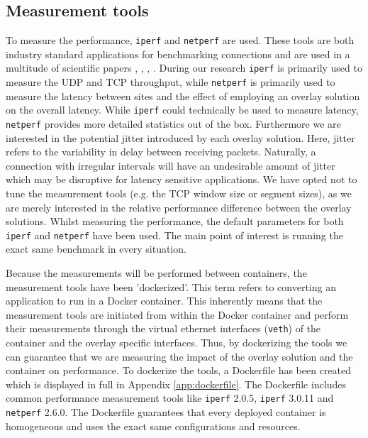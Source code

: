 \subsection{Measurement tools} \label{tools}
To measure the performance, \texttt{iperf} and \texttt{netperf} are used. These tools are both industry standard applications for benchmarking connections and are used in a multitude of scientific papers \cite{rohprimardho2015}, \cite{jorisclaassen2015}, \cite{Kra2015b}, \cite{barker2010empirical}. During our research \texttt{iperf} is primarily used to measure the UDP and TCP throughput, while \texttt{netperf} is primarily used to measure the latency between sites and the effect of employing an overlay solution on the overall latency. While \texttt{iperf} could technically be used to measure latency, \texttt{netperf} provides more detailed statistics out of the box. Furthermore we are interested in the potential jitter introduced by each overlay solution. Here, jitter refers to the variability in delay between receiving packets. Naturally, a connection with irregular intervals will have an undesirable amount of jitter which may be disruptive for latency sensitive applications. We have opted not to tune the measurement tools (e.g. the TCP window size or segment sizes), as we are merely interested in the relative performance difference between the overlay solutions. Whilst measuring the performance, the default parameters for both \texttt{iperf} and \texttt{netperf} have been used. The main point of interest is running the exact same benchmark in every situation. 

Because the measurements will be performed between containers, the measurement tools have been 'dockerized'. This term refers to converting an application to run in a Docker container. This inherently means that the measurement tools are initiated from within the Docker container and perform their measurements through the virtual ethernet interfaces (\texttt{veth}) of the container and the overlay specific interfaces. Thus, by dockerizing the tools we can guarantee that we are measuring the impact of the overlay solution and the container on performance. To dockerize the tools, a Dockerfile has been created which is displayed in full in Appendix \ref{app:dockerfile}. The Dockerfile includes common performance measurement tools like \texttt{iperf} 2.0.5, \texttt{iperf} 3.0.11 and \texttt{netperf} 2.6.0. The Dockerfile guarantees that every deployed container is homogeneous and uses the exact same configurations and resources. 

